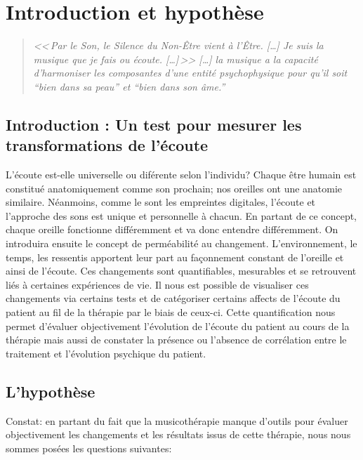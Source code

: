 \chapter{Introduction et hypothèse}

\label{jeSuisLaMusique:viret}
\begin{quotation}
\emph{<<\,\emph{Par le Son, le Silence du Non-Être vient à l'Être}. [\dots] 
\textsl{Je suis}
	\emph{la musique que je fais ou écoute}. [\dots]\,>>
[\ldots] \emph{la musique a la capacité d'harmoniser
les composantes d'une entité psychophysique pour qu'il soit ``bien
dans sa peau'' et ``bien dans son âme.}''}\, \autocite[ch. 1,  p. 8]{viret:b}
\end{quotation}





\section{Introduction : Un test pour mesurer les trans\-for\-ma\-tions de l'écoute}

L'écoute est-elle universelle ou diférente selon l'individu?
 Chaque être humain est constitué anatomiquement comme son prochain;
 nos oreilles ont  une anatomie similaire. Néanmoins, comme le sont 
les empreintes digitales, l'écoute et l'approche des sons est unique
et personnelle à chacun. En partant de ce concept, chaque oreille
fonctionne différemment et va donc entendre différemment. On
introduira ensuite le concept de perméabilité au
changement. L'environnement, le temps, les ressentis apportent leur
part au façonnement constant de l'oreille et ainsi de l'écoute. Ces
changements sont quantifiables, mesurables et se retrouvent liés à
certaines expériences de vie. Il nous est possible de visualiser ces
changements via certains tests et de catégoriser certains affects de
l'écoute du patient au fil de la thérapie par le biais de
ceux-ci. Cette quantification nous permet d'évaluer objectivement
l'évolution de l'écoute du patient au cours de la thérapie  mais aussi
de constater la présence ou l'absence de corrélation entre le
traitement et l'évolution psychique du patient.



\section{L'hypothèse}


   Constat: en partant du fait que la musicothérapie manque d'outils
   pour évaluer objectivement les changements et les résultats issus
   de cette thérapie, nous nous sommes posées les questions suivantes: 



